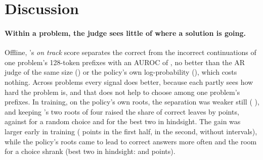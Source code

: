 
\section{Discussion}\label{sec:discussion}

\paragraph{Within a problem, the judge sees little of where a solution is going.} Offline, \kev{}'s \emph{on track}
score separates the correct from the incorrect continuations of one problem's 128-token prefixes with an AUROC of
, no better than the AR judge of the same size () or the policy's own
log-probability (), which costs nothing. Across problems every signal does better, because each
partly sees how hard the problem is, and that does not help to choose among one problem's prefixes. In training, on
the policy's own roots, the separation was weaker still (
), and keeping \kev{}'s two roots of four raised
the share of correct leaves by 
 points, against  for a
random choice and  for the best two in hindsight. The gain was larger early in training
( points in the first half,  in the second, without
intervals), while the policy's roots came to lead to correct answers more often and the room for a choice shrank (best
two in hindsight:  and  points).

